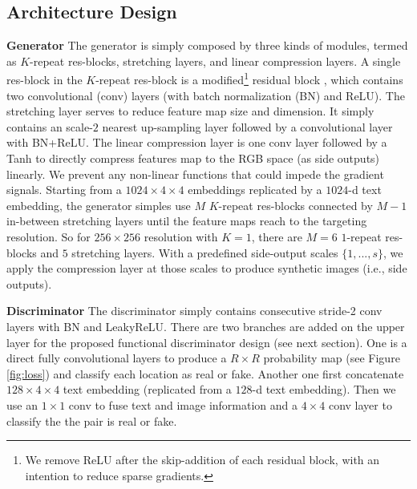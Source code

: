 \documentclass[10pt,twocolumn,letterpaper]{article}
\begin{document}
\subsection{Architecture Design}

\textbf{Generator} The generator is simply composed by three kinds of modules, termed as $K$-repeat res-blocks, stretching layers, and linear compression layers.
A single res-block in the $K$-repeat res-block is a modified\footnote{We remove ReLU after the skip-addition of each residual block, with an intention to reduce sparse gradients.} residual block \cite{he2016identity}, which contains two convolutional (conv) layers (with batch normalization (BN) \cite{ioffe2015batch} and ReLU). The stretching layer serves to reduce feature map size and dimension. It simply contains an scale-$2$ nearest up-sampling layer followed by a convolutional layer with BN+ReLU. The linear compression layer is one conv layer followed by a Tanh to directly compress features map to the RGB space (as side outputs) linearly. We prevent any non-linear functions that could impede the gradient signals. 
Starting from a $1024{\times}4{\times}4$ embeddings replicated by a $1024$-d text embedding, the generator simples use $M$ $K$-repeat res-blocks connected by $M{-}1$ in-between stretching layers until the feature maps reach to the targeting resolution. So for $256{\times}256$ resolution with $K{=}1$, there are $M{=}6$ $1$-repeat res-blocks and $5$ stretching layers. 
With a predefined side-output scales $\{1,...,s\}$, we apply the compression layer at those scales to produce synthetic images (i.e., side outputs).

\textbf{Discriminator} The discriminator simply contains consecutive stride-2 conv layers with BN and LeakyReLU. There are two branches are added on the upper layer for the proposed functional discriminator design (see next section). One is a direct fully convolutional layers to produce a $R{\times}R$ probability map (see Figure \ref{fig:loss}) and classify each location as real or fake. 
Another one first concatenate $128{\times}4{\times}4$ text embedding (replicated from a $128$-d text embedding). Then we use an $1{\times}1$ conv to fuse text and image information and  a $4{\times}4$ conv layer to classify the the pair is real or fake.
\end{document}
